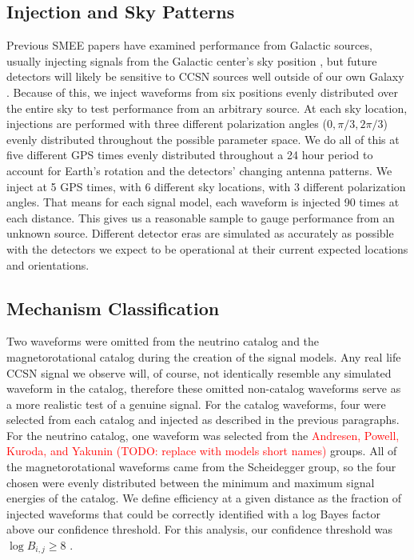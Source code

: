 \documentclass[letterpaper, aps, prd, twocolumn, superscriptaddress, showpacs, nofootinbib]{revtex4}
\newcommand{\jade}{\textcolor{red}}
\begin{document}
\subsection{Injection and Sky Patterns}

Previous SMEE papers have examined performance from Galactic sources, usually injecting signals from the Galactic center's sky position \cite{powell:16b, 2017PhRvD..96l3013P}, but future detectors will likely be sensitive to CCSN sources well outside of our own Galaxy \cite{0264-9381-27-19-194002, 2017CQGra..34d4001A}. Because of this, we inject waveforms from six positions evenly distributed over the entire sky to test performance from an arbitrary source. At each sky location, injections are performed with three different polarization angles ($0, \pi/3, 2\pi/3$) evenly distributed throughout the possible parameter space. We do all of this at five different GPS times evenly distributed throughout a 24 hour period to account for Earth's rotation and the detectors' changing antenna patterns.  We inject at 5 GPS times, with 6 different sky locations, with 3 different polarization angles. That means for each signal model, each waveform is injected 90 times at each distance. This gives us a reasonable sample to gauge performance from an unknown source. Different detector eras are simulated as accurately as possible with the detectors we expect to be operational at their current expected locations and orientations.

\subsection{Mechanism Classification}

Two waveforms were omitted from the neutrino catalog and the magnetorotational catalog during the creation of the signal models. Any real life CCSN signal we observe will, of course, not identically resemble any simulated waveform in the catalog, therefore these omitted non-catalog waveforms serve as a more realistic test of a genuine signal. For the catalog waveforms, four were selected from each catalog and injected as described in the previous paragraphs. For the neutrino catalog, one waveform was selected from the \jade{Andresen, Powell, Kuroda, and Yakunin (TODO: replace with models short names)} groups. All of the magnetorotational waveforms came from the Scheidegger group, so the four chosen were evenly distributed between the minimum and maximum signal energies of the catalog. We define efficiency at a given distance as the fraction of injected waveforms that could be correctly identified with a log Bayes factor above our confidence threshold. For this analysis, our confidence threshold was $\log B_{i,j} \geq 8$ \cite{powell:16b, 2017PhRvD..96l3013P}.
\end{document}
